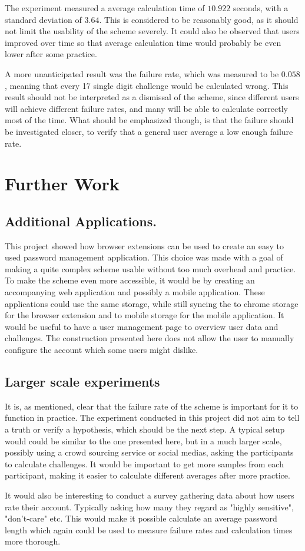 \par The experiment measured a average calculation time of $10.922$ seconds, with a standard deviation of $3.64$. This is considered to be reasonably good, as it should not limit the usability of the scheme severely. It could also be observed that users improved over time so that average calculation time would probably be even lower after some practice. 
\par A more unanticipated result was the failure rate, which was measured to be $0.058$, meaning that every 17 single digit challenge would be calculated wrong. This result should not be interpreted as a dismissal of the scheme, since different users will achieve different failure rates, and many will be able to calculate correctly most of the time. What should be emphasized though, is that the failure should be investigated closer, to verify that a general user average a low enough failure rate. 


\section{Further Work}

\subsection{Additional Applications.}
This project showed how browser extensions can be used to create an easy to used password management application. This choice was made with a goal of making a quite complex scheme usable without too much overhead and practice. To make the scheme even more accessible, it would be by creating an accompanying web application and possibly a mobile application. These applications could use the same storage, while still syncing the to chrome storage for the browser extension and to mobile storage for the mobile application. It would be useful to have a user management page to overview user data and challenges. The construction presented here does not allow the user to manually configure the account which some users might dislike. 

\subsection{Larger scale experiments}
It is, as mentioned, clear that the failure rate of the scheme is important for it to function in practice. The experiment conducted in this project did not aim to tell a truth or verify a hypothesis, which should be the next step. A typical setup would could be similar to the one presented here, but in a much larger scale, possibly using a crowd sourcing service or social medias, asking the participants to calculate challenges. It would be important to get more samples from each participant, making it easier to calculate different averages after more practice.  
\par It would also be interesting to conduct a survey gathering data about how users rate their account. Typically asking how many they regard as "highly sensitive", "don't-care" etc. This would make it possible calculate an average password length which again could be used to measure failure rates and calculation times more thorough. 
